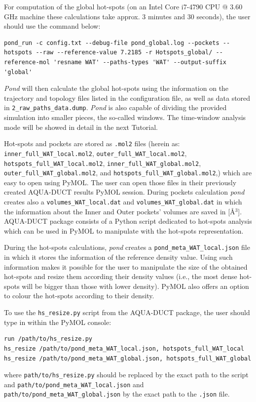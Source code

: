 \documentclass[9pt,tutorial]{livecoms}
\begin{document}
For computation of the global hot-spots (on an Intel Core i7-4790 CPU @ 3.60 GHz machine these calculations take approx. 3 minutes and 30 seconds), the user should use the command below:
\begin{lstlisting}[columns=fullflexible]
pond_run -c config.txt --debug-file pond_global.log --pockets --hotspots --raw --reference-value 7.2185 -r Hotspots_global/ --reference-mol 'resname WAT' --paths-types 'WAT' --output-suffix 'global'
\end{lstlisting}
\emph{Pond} will then calculate the global hot-spots using the information on the trajectory and topology files listed in the configuration file, as well as data stored in \texttt{2\_raw\_paths\_data.dump}. 
\emph{Pond} is also capable of dividing the provided simulation into smaller pieces, the so-called windows. The time-window analysis mode will be showed in detail in the next Tutorial.

Hot-spots and pockets are stored as \texttt{.mol2} files (herein as: \texttt{inner\_full\_WAT\_local.mol2}, \texttt{outer\_full\_WAT\_local.mol2}, \texttt{hotspots\_full\_WAT\_local.mol2}, \newline \texttt{inner\_full\_WAT\_global.mol2}, \texttt{outer\_full\_WAT\_global.mol2}, and \texttt{hotspots\_full\_WAT\_global.mol2},) which are easy to open using PyMOL. The user can open those files in their previously created AQUA-DUCT results PyMOL session. During pockets calculation \emph{pond} creates also a \texttt{volumes\_WAT\_local.dat} and \texttt{volumes\_WAT\_global.dat} in which the information about the Inner and Outer pockets' volumes are saved in [Å\( \displaystyle ^{3}\)]. AQUA-DUCT package consists of a Python script dedicated to hot-spots analysis which can be used in PyMOL to manipulate with the hot-spots representation. 

During the hot-spots calculations, \emph{pond} creates a \texttt{pond\_meta\_WAT\_local.json} file in which it stores the information of the reference density value. Using such information makes it possible for the user to manipulate the size of the obtained hot-spots and resize them according their density values (i.e., the most dense hot-spots will be bigger than those with lower density). PyMOL also offers an option to colour the hot-spots according to their density.

To use the \texttt{hs\_resize.py} script from the AQUA-DUCT package, the user should type in within the PyMOL console:
\begin{lstlisting}[columns=fullflexible]
run /path/to/hs_resize.py
hs_resize /path/to/pond_meta_WAT_local.json, hotspots_full_WAT_local
hs_resize /path/to/pond_meta_WAT_global.json, hotspots_full_WAT_global
\end{lstlisting}
where \texttt{path/to/hs\_resize.py} should be replaced by the exact path to the script and \texttt{path/to/pond\_meta\_WAT\_local.json} and \texttt{path/to/pond\_meta\_WAT\_global.json} by the exact path to the \texttt{.json} file. 
\end{document}
